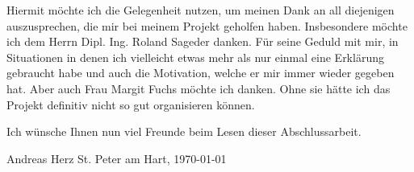 Hiermit möchte ich die Gelegenheit nutzen, um meinen Dank an all diejenigen auszusprechen, die mir bei meinem Projekt geholfen haben. Insbesondere möchte ich dem Herrn Dipl. Ing. Roland Sageder danken. Für seine Geduld mit mir, in Situationen in denen ich vielleicht etwas mehr als nur einmal eine Erklärung gebraucht habe und auch die Motivation, welche er mir immer wieder gegeben hat. Aber auch Frau Margit Fuchs möchte ich danken. Ohne sie hätte ich das Projekt definitiv nicht so gut organisieren können. \newline

Ich wünsche Ihnen nun viel Freunde beim Lesen dieser Abschlussarbeit.\newline

Andreas Herz 
\newline
{} St. Peter am Hart, \today
